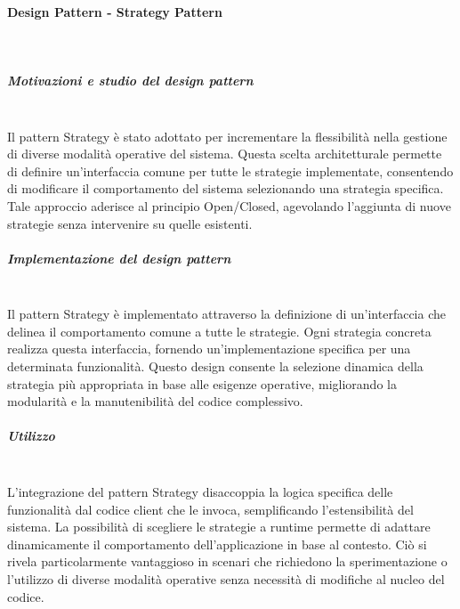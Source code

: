 \documentclass[10pt]{article}
\newcommand{\myparagraph}[1]{\paragraph{#1}\mbox{}\\}
\newcommand{\mysubparagraph}[1]{\subparagraph{#1}\mbox{}\\}
\begin{document}
    \myparagraph{Design Pattern - Strategy Pattern}

    \mysubparagraph{Motivazioni e studio del design pattern}
    Il pattern Strategy è stato adottato per incrementare la flessibilità nella gestione di diverse modalità operative del sistema. Questa scelta architetturale permette di definire un'interfaccia comune per tutte le strategie implementate, consentendo di modificare il comportamento del sistema selezionando una strategia specifica. Tale approccio aderisce al principio Open/Closed, agevolando l'aggiunta di nuove strategie senza intervenire su quelle esistenti.

    \mysubparagraph{Implementazione del design pattern}
    Il pattern Strategy è implementato attraverso la definizione di un'interfaccia che delinea il comportamento comune a tutte le strategie. Ogni strategia concreta realizza questa interfaccia, fornendo un'implementazione specifica per una determinata funzionalità. Questo design consente la selezione dinamica della strategia più appropriata in base alle esigenze operative, migliorando la modularità e la manutenibilità del codice complessivo.

    \mysubparagraph{Utilizzo}
    L'integrazione del pattern Strategy disaccoppia la logica specifica delle funzionalità dal codice client che le invoca, semplificando l'estensibilità del sistema. La possibilità di scegliere le strategie a runtime permette di adattare dinamicamente il comportamento dell'applicazione in base al contesto. Ciò si rivela particolarmente vantaggioso in scenari che richiedono la sperimentazione o l'utilizzo di diverse modalità operative senza necessità di modifiche al nucleo del codice.
\end{document}
